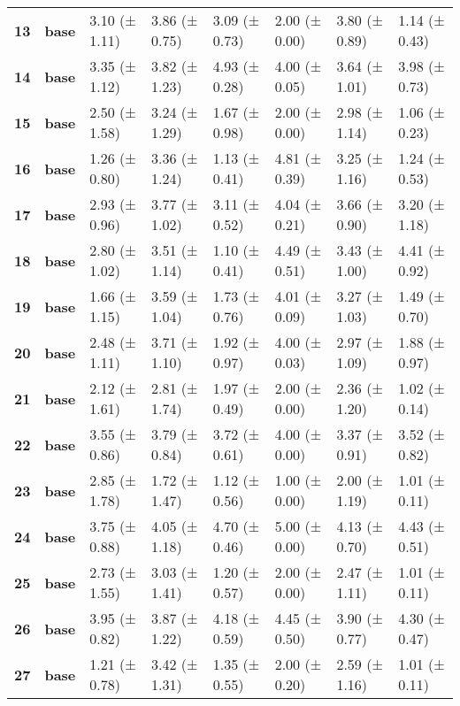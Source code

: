 \begin{longtable}{llllllll}
\cline{1-8}
\textbf{13} & \textbf{base} & 3.10 (± 1.11) & 3.86 (± 0.75) & 3.09 (± 0.73) & 2.00 (± 0.00) & 3.80 (± 0.89) & 1.14 (± 0.43) \\
\cline{1-8}
\textbf{14} & \textbf{base} & 3.35 (± 1.12) & 3.82 (± 1.23) & 4.93 (± 0.28) & 4.00 (± 0.05) & 3.64 (± 1.01) & 3.98 (± 0.73) \\
\cline{1-8}
\textbf{15} & \textbf{base} & 2.50 (± 1.58) & 3.24 (± 1.29) & 1.67 (± 0.98) & 2.00 (± 0.00) & 2.98 (± 1.14) & 1.06 (± 0.23) \\
\cline{1-8}
\textbf{16} & \textbf{base} & 1.26 (± 0.80) & 3.36 (± 1.24) & 1.13 (± 0.41) & 4.81 (± 0.39) & 3.25 (± 1.16) & 1.24 (± 0.53) \\
\cline{1-8}
\textbf{17} & \textbf{base} & 2.93 (± 0.96) & 3.77 (± 1.02) & 3.11 (± 0.52) & 4.04 (± 0.21) & 3.66 (± 0.90) & 3.20 (± 1.18) \\
\cline{1-8}
\textbf{18} & \textbf{base} & 2.80 (± 1.02) & 3.51 (± 1.14) & 1.10 (± 0.41) & 4.49 (± 0.51) & 3.43 (± 1.00) & 4.41 (± 0.92) \\
\cline{1-8}
\textbf{19} & \textbf{base} & 1.66 (± 1.15) & 3.59 (± 1.04) & 1.73 (± 0.76) & 4.01 (± 0.09) & 3.27 (± 1.03) & 1.49 (± 0.70) \\
\cline{1-8}
\textbf{20} & \textbf{base} & 2.48 (± 1.11) & 3.71 (± 1.10) & 1.92 (± 0.97) & 4.00 (± 0.03) & 2.97 (± 1.09) & 1.88 (± 0.97) \\
\cline{1-8}
\textbf{21} & \textbf{base} & 2.12 (± 1.61) & 2.81 (± 1.74) & 1.97 (± 0.49) & 2.00 (± 0.00) & 2.36 (± 1.20) & 1.02 (± 0.14) \\
\cline{1-8}
\textbf{22} & \textbf{base} & 3.55 (± 0.86) & 3.79 (± 0.84) & 3.72 (± 0.61) & 4.00 (± 0.00) & 3.37 (± 0.91) & 3.52 (± 0.82) \\
\cline{1-8}
\textbf{23} & \textbf{base} & 2.85 (± 1.78) & 1.72 (± 1.47) & 1.12 (± 0.56) & 1.00 (± 0.00) & 2.00 (± 1.19) & 1.01 (± 0.11) \\
\cline{1-8}
\textbf{24} & \textbf{base} & 3.75 (± 0.88) & 4.05 (± 1.18) & 4.70 (± 0.46) & 5.00 (± 0.00) & 4.13 (± 0.70) & 4.43 (± 0.51) \\
\cline{1-8}
\textbf{25} & \textbf{base} & 2.73 (± 1.55) & 3.03 (± 1.41) & 1.20 (± 0.57) & 2.00 (± 0.00) & 2.47 (± 1.11) & 1.01 (± 0.11) \\
\cline{1-8}
\textbf{26} & \textbf{base} & 3.95 (± 0.82) & 3.87 (± 1.22) & 4.18 (± 0.59) & 4.45 (± 0.50) & 3.90 (± 0.77) & 4.30 (± 0.47) \\
\cline{1-8}
\textbf{27} & \textbf{base} & 1.21 (± 0.78) & 3.42 (± 1.31) & 1.35 (± 0.55) & 2.00 (± 0.20) & 2.59 (± 1.16) & 1.01 (± 0.11) \\

\end{longtable}
